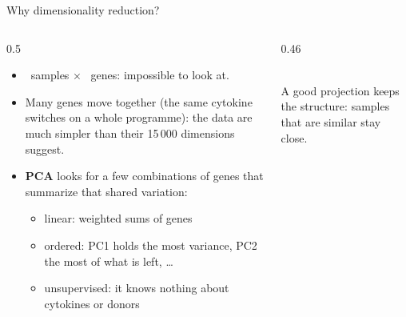 \begin{frame}{Why dimensionality reduction?}
  \begin{columns}[c]
    \begin{column}{0.5\linewidth}
      \begin{itemize}\setlength\itemsep{5pt}
        \item \numnsamples\ samples $\times$ \numngenes\ genes: impossible to look at.
        \item Many genes move \alert{together} (the same cytokine switches on a whole programme): the data are much simpler than their 15\,000 dimensions suggest.
        \item \textbf{PCA} looks for a few \alert{combinations of genes} that summarize that shared variation:
        \begin{itemize}\small
          \item \alert{linear}: weighted sums of genes
          \item \alert{ordered}: PC1 holds the most variance, PC2 the most of what is left, \ldots
          \item \alert{unsupervised}: it knows nothing about cytokines or donors
        \end{itemize}
      \end{itemize}
    \end{column}
    \begin{column}{0.46\linewidth}
      \centering
      \\[4pt]
      \footnotesize A good projection keeps the \alert{structure}: samples that are similar stay close.
    \end{column}
  \end{columns}
\end{frame}

